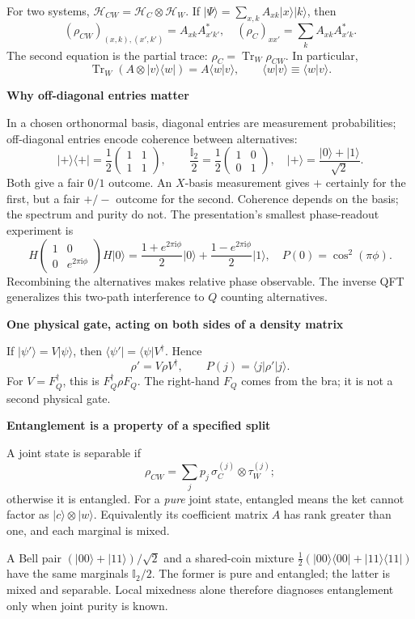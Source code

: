 \documentclass[11pt,a4paper]{article}
\newcommand{\ket}[1]{\lvert#1\rangle}
\newcommand{\bra}[1]{\langle#1\rvert}
\newcommand{\braket}[1]{\langle#1\rangle}
\newcommand{\proj}[1]{\ket{#1}\!\bra{#1}}
\newcommand{\tr}{\operatorname{Tr}}
\newcommand{\ii}{\mathrm{i}}
\newcommand{\id}{\mathbb I}
\newcommand{\lead}[1]{\par\vspace{3pt}\textbf{\color{ink}#1}\par}
\begin{document}
For two systems, \(\mathcal H_{CW}=\mathcal H_C\otimes\mathcal H_W\). If
\(\ket{\Psi}=\sum_{x,k}A_{xk}\ket{x}\ket{k}\), then
\[
(\rho_{CW})_{(x,k),(x',k')}=A_{xk}A_{x'k'}^*,
\quad
(\rho_C)_{xx'}=\sum_kA_{xk}A_{x'k}^*.
\]
The second equation is the partial trace: \(\rho_C=\tr_W\rho_{CW}\). In particular,
\[
\tr_W\!\left(A\otimes\ket v\bra w\right)=A\braket{w|v},
\qquad\braket{w|v}\equiv\langle w|v\rangle .
\]
\lead{Why off-diagonal entries matter}
In a chosen orthonormal basis, diagonal entries are measurement probabilities; off-diagonal entries encode coherence between alternatives:
\[
\proj{+}=\frac12\begin{pmatrix}1&1\\1&1\end{pmatrix},
\qquad
\frac{\id_2}{2}=\frac12\begin{pmatrix}1&0\\0&1\end{pmatrix},
\quad
\ket+=\frac{\ket0+\ket1}{\sqrt2}.
\]
Both give a fair \(0/1\) outcome. An \(X\)-basis measurement gives \(+\) certainly for the first, but a fair \(+/-\) outcome for the second. Coherence depends on the basis; the spectrum and purity do not. The presentation's smallest phase-readout experiment is
\[
H\!\begin{pmatrix}1&0\\0&e^{2\pi\ii\phi}\end{pmatrix}\!H\ket0
=\frac{1+e^{2\pi\ii\phi}}2\ket0+\frac{1-e^{2\pi\ii\phi}}2\ket1,
\quad P(0)=\cos^2(\pi\phi).
\]
Recombining the alternatives makes relative phase observable. The inverse QFT generalizes this two-path interference to \(Q\) counting alternatives.

\lead{One physical gate, acting on both sides of a density matrix}
If \(\ket{\psi'}=V\ket\psi\), then \(\bra{\psi'}=\bra\psi V^\dagger\). Hence
\[
\rho'=V\rho V^\dagger,\qquad
P(j)=\bra j\rho'\ket j.
\]
For \(V=F_Q^\dagger\), this is \(F_Q^\dagger\rho F_Q\). The right-hand \(F_Q\) comes from the bra; it is not a second physical gate.

\lead{Entanglement is a property of a specified split}
A joint state is separable if
\[
\rho_{CW}=\sum_jp_j\,\sigma_C^{(j)}\otimes\tau_W^{(j)};
\]
otherwise it is entangled. For a \emph{pure} joint state, entangled means the ket cannot factor as \(\ket c\otimes\ket w\). Equivalently its coefficient matrix \(A\) has rank greater than one, and each marginal is mixed.

A Bell pair \((\ket{00}+\ket{11})/\sqrt2\) and a shared-coin mixture
\(\frac12(\proj{00}+\proj{11})\) have the same marginals \(\id_2/2\). The former is pure and entangled; the latter is mixed and separable. Local mixedness alone therefore diagnoses entanglement only when joint purity is known.
\end{document}
